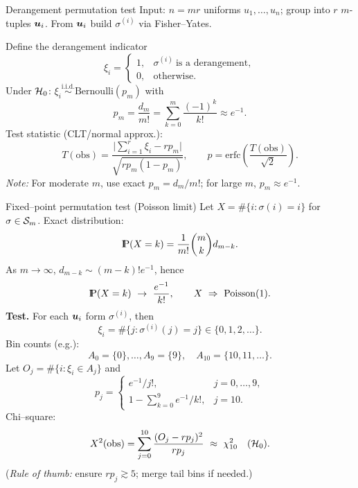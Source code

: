 \documentclass[aspectratio=169]{beamer}
\newcommand{\Prob}{{\rm I\hspace{-0.8mm}P}}
\begin{document}
\begin{frame}{Derangement permutation test}
Input: $n=mr$ uniforms $u_1,\ldots,u_n$; group into $r$ $m$-tuples $\mbox{\boldmath$u$}_i$.
From $\mbox{\boldmath$u$}_i$ build $\sigma^{(i)}$ via \textsf{Fisher–Yates}.

Define the derangement indicator
\[
\xi_i=\begin{cases}
1,& \sigma^{(i)}\ \text{is a derangement},\\
0,& \text{otherwise}.
\end{cases}
\]
\pause
Under ${\cal H}_0$: $\xi_i\stackrel{\text{i.i.d.}}{\sim}\mathrm{Bernoulli}(p_m)$ with
\[
p_m=\frac{d_m}{m!}=\sum_{k=0}^{m}\frac{(-1)^k}{k!}\approx e^{-1}.
\]
\pause
Test statistic (CLT/normal approx.):
\[
T(\mathrm{obs})=\frac{\bigl|\sum_{i=1}^{r}\xi_i-rp_m\bigr|}{\sqrt{r p_m(1-p_m)}},\qquad
p=\mathrm{erfc}\!\left(\frac{T(\mathrm{obs})}{\sqrt{2}}\right).
\]
\emph{Note:} For moderate $m$, use exact $p_m=d_m/m!$; for large $m$, $p_m\approx e^{-1}$.
\end{frame}


\begin{frame}{Fixed–point permutation test (Poisson limit)}
Let $X=\#\{i:\sigma(i)=i\}$ for $\sigma\in{\cal S}_m$. Exact distribution:
\[
\Prob(X=k)=\frac{1}{m!}{m\choose k}d_{m-k}.
\]
As $m\to\infty$, $d_{m-k}\sim (m-k)!e^{-1}$, hence
\[
\Prob(X=k)\ \to\ \frac{e^{-1}}{k!},\qquad X\ \Rightarrow\ \mathrm{Poisson}(1).
\]
\pause
\textbf{Test.} For each $\mbox{\boldmath$u$}_i$ form $\sigma^{(i)}$, then
\[
\xi_i=\#\{j:\sigma^{(i)}(j)=j\}\in\{0,1,2,\ldots\}.
\]
Bin counts (e.g.):
\[
A_0=\{0\},\ldots,A_9=\{9\},\quad A_{10}=\{10,11,\ldots\}.
\]
Let $O_j=\#\{i:\xi_i\in A_j\}$ and
\[
p_j=\begin{cases}
e^{-1}/j!, & j=0,\ldots,9,\\[2pt]
1-\sum_{k=0}^{9}e^{-1}/k!, & j=10.
\end{cases}
\]
Chi–square:
\[
X^2(\mathrm{obs})=\sum_{j=0}^{10}\frac{(O_j-rp_j)^2}{rp_j}\ \approx\ \chi^2_{10}\quad(\calH_0).
\]
(\emph{Rule of thumb:} ensure $rp_j\gtrsim5$; merge tail bins if needed.)
\end{frame}
\end{document}
